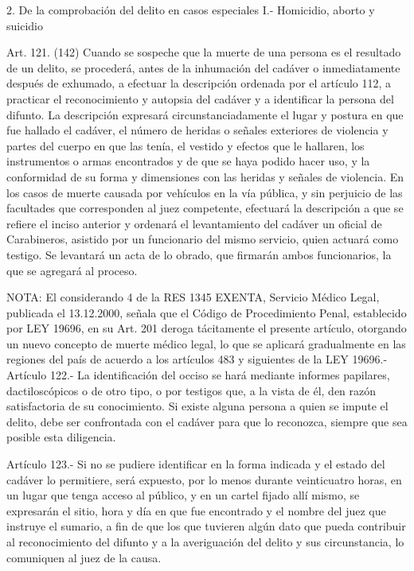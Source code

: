   2. De la comprobación del delito en casos
especiales
    I.- Homicidio, aborto y suicidio

    Art. 121. (142) Cuando se sospeche que la muerte de una persona es el resultado de un delito, se procederá, antes de la inhumación del cadáver o inmediatamente después de exhumado, a efectuar la descripción ordenada por el artículo 112, a practicar el reconocimiento y autopsia del cadáver y a identificar la persona del difunto.
    La descripción expresará circunstanciadamente el lugar y postura en que fue hallado el cadáver, el número de heridas o señales exteriores de violencia y partes del cuerpo en que las tenía, el vestido y efectos que le hallaren, los instrumentos o armas encontrados y de que se haya podido hacer uso, y la conformidad de su forma y dimensiones con las heridas y señales de violencia.
    En los casos de muerte causada por vehículos en la vía pública, y sin perjuicio de las facultades que corresponden al juez competente, efectuará la descripción a que se refiere el inciso anterior y ordenará el levantamiento del cadáver un oficial de Carabineros, asistido por un funcionario del mismo servicio, quien actuará como testigo. Se levantará un acta de lo obrado, que firmarán ambos funcionarios, la que se agregará al proceso.

NOTA:
      El considerando 4 de la RES 1345 EXENTA, Servicio Médico Legal, publicada el 13.12.2000, señala que el Código de Procedimiento Penal, establecido por LEY 19696, en su Art. 201 deroga tácitamente el presente artículo, otorgando un nuevo concepto de muerte médico legal, lo que se aplicará gradualmente en las regiones del país de acuerdo a los artículos 483 y siguientes de la LEY 19696.-
    Artículo 122.- La identificación del occiso se hará mediante informes papilares, dactiloscópicos o de otro tipo, o por testigos que, a la vista de él, den razón
satisfactoria de su conocimiento.  Si existe alguna persona a quien se impute el delito, debe ser confrontada con el cadáver para que lo reconozca, siempre que sea posible esta diligencia.

    Artículo 123.- Si no se pudiere identificar en la forma indicada y el estado del cadáver lo permitiere, será expuesto, por lo menos durante veinticuatro horas, en un lugar que tenga acceso al público, y en un cartel fijado allí mismo, se expresarán el sitio, hora y día en que fue encontrado y el nombre del juez que instruye el sumario, a fin de que los que tuvieren algún dato que pueda contribuir al reconocimiento del difunto y a la averiguación del delito y sus circunstancia, lo comuniquen al juez de la causa.

